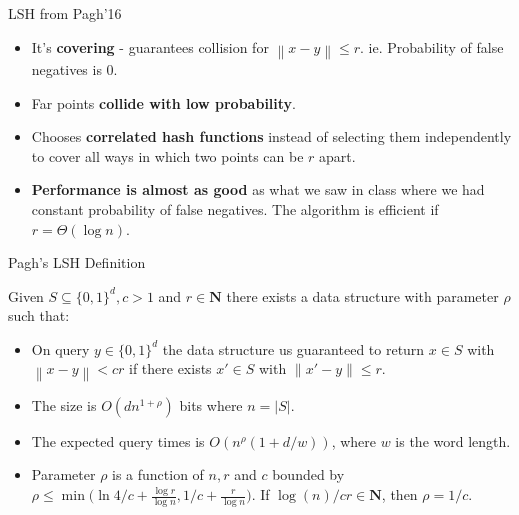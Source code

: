 \documentclass[xcolor=svgnames]{beamer}
\newcommand{\norm}[1]{\left\lVert#1\right\rVert}
\begin{document}
\begin{frame}{LSH from Pagh'16}
\begin{itemize}
    \item It's \textbf{covering} - guarantees collision for $\norm{x-y} \leq r$. ie. Probability of false negatives is 0.
    \pause
    \item Far points \textbf{collide with low probability}.
    \pause
    \item Chooses \textbf{correlated hash functions} instead of selecting them independently to cover all ways in which two points can be $r$ apart.
    \pause
    \item \textbf{Performance is almost as good} as what we saw in class where we had constant probability of false negatives. The algorithm is efficient if $r = \Theta(\log{n})$.
\end{itemize}
\end{frame}

\begin{frame}{Pagh's LSH Definition}
\begin{theorem*}
[Pagh'16] Given $S \subseteq \{0,1\}^d, c>1$ and $r \in \mathbf{N}$ there exists a data structure with parameter $\rho$ such that:
\begin{itemize}
	\item {\color{important}\large{On query $y \in \{0,1\}^d$ the data structure us guaranteed to return $x \in S$ with $\norm{x-y} < cr$ if there exists $x' \in S$ with $\norm{x'-y} \leq r$.}}
	\item The size is $O(dn^{1+\rho})$ bits where $n = |S|$.
	\item The expected query times is $O(n^\rho(1+d/w))$, where $w$ is the word length.
	\item Parameter $\rho$ is a function of $n, r$ and $c$ bounded by $\rho \leq \min{\Big(\ln{4}/c + \frac{\log{r}}{\log{n}}, 1/c + \frac{r}{\log{n}}\Big)}$. {\color{important} \large{If $\log{(n)}/cr \in \mathbf{N}$, then $\rho = 1/c$.}}
\end{itemize}
\end{theorem*}
\end{frame}
\end{document}
